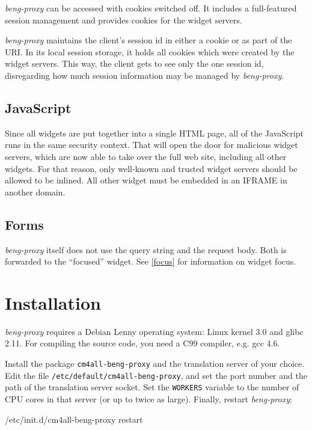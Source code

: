 \documentclass[a4paper,12pt]{article}
\begin{document}
\emph{beng-proxy} can be accessed with cookies switched off.  It includes a
full-featured session management and provides cookies for the widget
servers.

\emph{beng-proxy} maintains the client's session id in either a cookie
or as part of the URI.  In its local session storage, it holds all
cookies which were created by the widget servers.  This way, the
client gets to see only the one session id, disregarding how much
session information may be managed by \emph{beng-proxy}.


\subsection{JavaScript}

Since all widgets are put together into a single HTML page, all of the
JavaScript runs in the same security context.  That will open the door
for malicious widget servers, which are now able to take over the full
web site, including all other widgets.  For that reason, only
well-known and trusted widget servers should be allowed to be inlined.
All other widget must be embedded in an IFRAME in another domain.


\subsection{Forms}

\emph{beng-proxy} itself does not use the query string and the request
body.  Both is forwarded to the ``focused'' widget.  See \ref{focus}
for information on widget focus.


\section{Installation}

\emph{beng-proxy} requires a Debian Lenny operating system: Linux
kernel 3.0 and glibc 2.11.  For compiling the source code, you need
a C99 compiler, e.g. gcc 4.6.

Install the package \texttt{cm4all-beng-proxy} and the translation
server of your choice.  Edit the file
\texttt{/etc/default/cm4all-beng-proxy}, and set the port number and
the path of the translation server socket.  Set the \texttt{WORKERS}
variable to the number of CPU cores in that server (or up to twice as
large).  Finally, restart \emph{beng-proxy}:

\begin{verbatim*}
/etc/init.d/cm4all-beng-proxy restart
\end{verbatim*}
\end{document}
